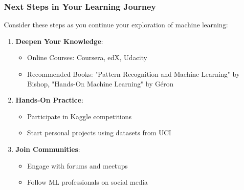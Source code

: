 \documentclass[aspectratio=169]{beamer}
\begin{document}
\begin{frame}[fragile]
    \frametitle{Next Steps in Your Learning Journey}
    
    Consider these steps as you continue your exploration of machine learning:
    
    \begin{enumerate}
        \item \textbf{Deepen Your Knowledge}:
        \begin{itemize}
            \item Online Courses: Coursera, edX, Udacity
            \item Recommended Books: "Pattern Recognition and Machine Learning" by Bishop, "Hands-On Machine Learning" by Géron
        \end{itemize}
        
        \item \textbf{Hands-On Practice}:
        \begin{itemize}
            \item Participate in Kaggle competitions
            \item Start personal projects using datasets from UCI
        \end{itemize}
        
        \item \textbf{Join Communities}:
        \begin{itemize}
            \item Engage with forums and meetups
            \item Follow ML professionals on social media
        \end{itemize}
    \end{enumerate}
\end{frame}
\end{document}
